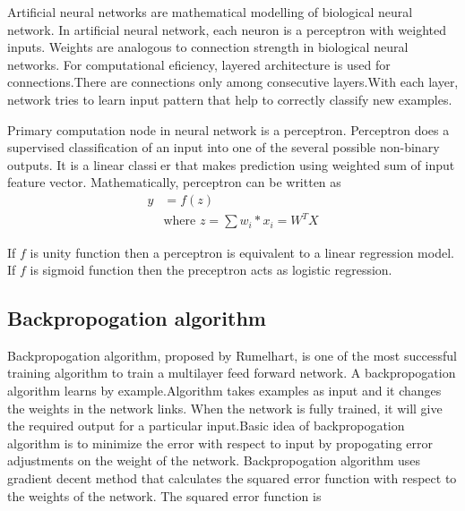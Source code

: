 \documentclass[12pt,a4paper,final]{extreport}
\begin{document}
Artificial neural networks are mathematical modelling of biological neural network. In artificial neural network, each neuron is a perceptron with weighted inputs. Weights are analogous to connection strength in biological neural networks. For computational eficiency, layered architecture is used for connections.There are connections only among consecutive layers.With each layer, network tries to learn input pattern that help to correctly classify new examples.


\vspace{0.5cm}
Primary computation node in neural network is a perceptron. Perceptron does a supervised classification of an input into one of the several possible non-binary outputs. It is a linear classier that makes
prediction using weighted sum of input feature vector. Mathematically, perceptron can be written as
\begin{equation}
\begin{split}
y & = f(z) \\
& \textrm{where } z = \sum w_{i} * x_{i} = W^{T}X
\end{split}
\end{equation}

\vspace{0.5cm}
If $f$ is unity function then a perceptron is equivalent to a linear regression model. If $f$ is sigmoid function then the preceptron acts as logistic regression.

\subsection{Backpropogation algorithm}
Backpropogation algorithm, proposed by Rumelhart, is one of the most successful training algorithm to train a multilayer feed forward network. A backpropogation algorithm learns by example.Algorithm takes examples as input and it changes the weights in the network links. When the network is fully trained, it will give the required output for a particular input.Basic idea of backpropogation algorithm is to minimize the error with respect to input by propogating error adjustments on the weight of the network. Backpropogation algorithm uses gradient decent method that calculates the squared error function with respect to the weights of the network. The squared error function is
\end{document}
